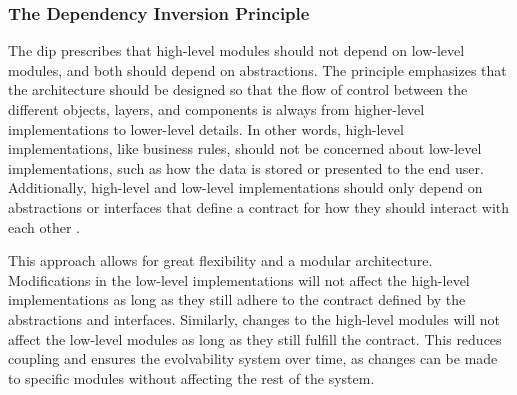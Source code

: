 \subsubsection{The Dependency Inversion Principle} \label{subsubsec_dip} 

The \gls{dip} prescribes that high-level modules should not depend on low-level modules,
and both should depend on abstractions. The principle emphasizes that the architecture
should be designed so that the flow of control between the different objects, layers, and
components is always from higher-level implementations to lower-level details. In other
words, high-level implementations, like business rules, should not be concerned about
low-level implementations, such as how the data is stored or presented to the end user.
Additionally, high-level and low-level implementations should only depend on abstractions
or interfaces that define a contract for how they should interact with each other
\parencite[91]{robert_c_martin_clean_2018}. 

This approach allows for great flexibility and a modular architecture. Modifications in
the low-level implementations will not affect the high-level implementations as long as
they still adhere to the contract defined by the abstractions and interfaces. Similarly,
changes to the high-level modules will not affect the low-level modules as long as they
still fulfill the contract. This reduces coupling and ensures the evolvability system over
time, as changes can be made to specific modules without affecting the rest of the system.